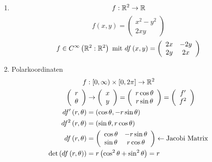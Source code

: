 \begin{enumerate}
\item \[f:\mathbb{R}^2\to\mathbb{R}\]
\[f\left( {x,y} \right) = \left( {\begin{array}{*{20}{c}}
{{x^2} - {y^2}}\\
{2xy}
\end{array}} \right)\]
\[f\in C^\infty\left( \R^2:\R^2\right) \text{ mit } df\left( {x,y} \right) = \left( {\begin{array}{*{20}{c}}
{2x}&{ - 2y}\\
{2y}&{2x}
\end{array}} \right) \]
\item Polarkoordinaten
\begin{align*}
f&:\lbrack 0,\infty)\times\lbrack 0,2\pi\rbrack\to\R^2\\
\left( {\begin{array}{*{20}{c}}
r\\
\theta
\end{array}} \right) &\to \left( {\begin{array}{*{20}{c}}
x\\
y
\end{array}} \right) = \left( {\begin{array}{*{20}{c}}
{r\cos \theta }\\
{r\sin \theta }
\end{array}} \right) = \left( {\begin{array}{*{20}{c}}
{f'}\\
{{f^2}}
\end{array}} \right)\\
df'\left( r,\theta\right)&=\left( \cos\theta, -r\sin\theta\right)\\
df^2\left( r,\theta\right)&=\left( \sin\theta, r\cos\theta\right)\\
df\left( {r,\theta } \right) &= \left( {\begin{array}{*{20}{c}}
{\cos \theta }&{ - r\sin \theta }\\
{\sin \theta }&{r\cos \theta }
\end{array}} \right) \leftarrow {\text{Jacobi Matrix}}\\
\det\left( df\left( r,\theta\right)\right)&=r\left( \cos^2\theta + \sin^2\theta\right)=r
\end{align*}

\begin{center}
\end{center}
\end{enumerate}
